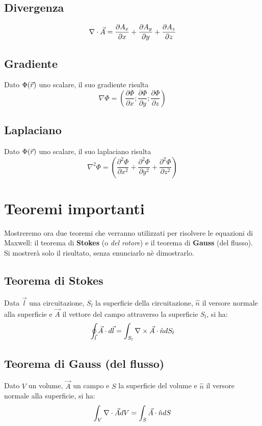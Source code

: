 \subsection{Divergenza}
\begin{equation}
  \nabla\cdot \vec{A} = \frac{\partial A_x}{\partial x} + \frac{\partial A_y}{\partial y} + \frac{\partial A_z}{\partial z}
\end{equation}
\subsection{Gradiente}
Dato $\Phi(\vec{r})$ uno scalare, il suo gradiente risulta
\begin{equation}
  \nabla \Phi = \left(\frac{\partial \Phi}{\partial x} ; \frac{\partial \Phi}{\partial y}; \frac{\partial \Phi}{\partial z}\right)
\end{equation}
\subsection{Laplaciano}
Dato $\Phi(\vec{r})$ uno scalare, il suo laplaciano risulta
\begin{equation}
  \nabla^2 \Phi = \left(\frac{\partial^2 \Phi}{\partial x^2} + \frac{\partial^2 \Phi}{\partial y^2} + \frac{\partial^2 \Phi}{\partial z^2}\right)
\end{equation}

\section{Teoremi importanti}
Mostreremo ora due teoremi che verranno utilizzati per risolvere le equazioni di Maxwell:
il teorema di \textbf{Stokes} (o \textit{del rotore}) e il teorema di \textbf{Gauss} (del flusso).
Si mostrerà solo il risultato, senza enunciarlo nè dimostrarlo.
\subsection{Teorema di Stokes}
Data $\vec{l}$ una circuitazione, $S_l$ la superficie della circuitazione, $\hat{n}$
 il versore normale alla superficie  e $\vec{A}$ il vettore del campo attraverso la superficie $S_l$, si ha:
\begin{equation}
  \oint_{\vec{l}} \vec{A} \cdot d\vec{l} = \int_{S_l}\nabla\times \vec{A} \cdot \hat{n} d S_l
\end{equation}

\subsection{Teorema di Gauss (del flusso)}
Dato $V$ un volume, $\vec{A}$ un campo e $S$ la superficie del volume e $\hat{n}$
il versore normale alla superficie, si ha:
\begin{equation}
  \int_V \nabla\cdot \vec{A} dV = \int_S \vec{A}\cdot \hat{n} dS
\end{equation}

